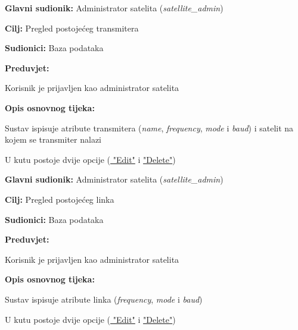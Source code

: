 	\noindent {}
	\begin{packed_item}
		
		\item \textbf{Glavni sudionik: }Administrator satelita (\textit{satellite\_admin})
		\item  \textbf{Cilj: }Pregled postojećeg transmitera
		\item  \textbf{Sudionici: }Baza podataka
		\item  \textbf{Preduvjet: }
		\begin{packed_enum}
			\item Korisnik je prijavljen kao administrator satelita	\end{packed_enum}
		\item  \textbf{Opis osnovnog tijeka: }
		
		\item[] \begin{packed_enum}
					
			\item Sustav ispisuje atribute transmitera (\textit{name}, \textit{frequency}, \textit{mode} i \textit{baud}) i satelit na kojem se transmiter nalazi
			\item U kutu postoje dvije opcije (\hyperref[UC14]{ "Edit"} i \hyperref[UC13]{ "Delete"})
			
			
		\end{packed_enum}
	\end{packed_item}
\noindent {}
\begin{packed_item}
	
	\item \textbf{Glavni sudionik: }Administrator satelita (\textit{satellite\_admin})
	\item  \textbf{Cilj: }Pregled postojećeg linka
	\item  \textbf{Sudionici: }Baza podataka
	\item  \textbf{Preduvjet: }
	\begin{packed_enum}
		\item Korisnik je prijavljen kao administrator satelita	\end{packed_enum}
	\item  \textbf{Opis osnovnog tijeka: }
	
	\item[] \begin{packed_enum}
		
		\item Sustav ispisuje atribute linka (\textit{frequency}, \textit{mode} i \textit{baud})
		\item U kutu postoje dvije opcije (\hyperref[UC18]{ "Edit"} i \hyperref[UC17]{ "Delete"})
		
		
	\end{packed_enum}
\end{packed_item}

